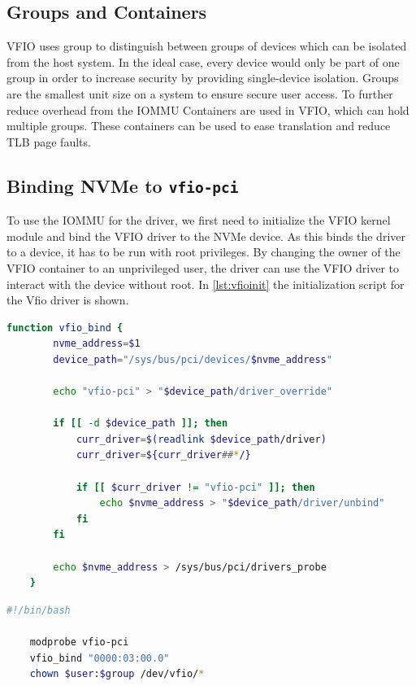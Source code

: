 \subsection{Groups and Containers}
VFIO uses group to distinguish between groups of devices which can be isolated from the host system. In the ideal case, every device would only be part of one group in order to increase security by providing single-device isolation. Groups are the smallest unit size on a system to ensure secure user access.
To further reduce overhead from the IOMMU Containers are used in VFIO, which can hold multiple groups. These containers can be used to ease translation and reduce TLB page faults.

\subsection{Binding NVMe to \texttt{vfio-pci}}\label{sec:bindvfiopci}
To use the IOMMU for the driver, we first need to initialize the VFIO kernel module and bind the VFIO driver to the NVMe device.
As this binds the driver to a device, it has to be run with root privileges.
By changing the owner of the VFIO container to an unprivileged user, the driver can use the VFIO driver to interact with the device without root.
In \autoref{lst:vfioinit} the initialization script for the Vfio driver is shown.

\begin{lstlisting}[language=bash,caption={\texttt{vfio-pci} binding function in bash}, label=lst:vfiobind, frame=single]
    function vfio_bind {
        nvme_address=$1
        device_path="/sys/bus/pci/devices/$nvme_address"

        echo "vfio-pci" > "$device_path/driver_override"

        if [[ -d $device_path ]]; then
            curr_driver=$(readlink $device_path/driver)
            curr_driver=${curr_driver##*/}

            if [[ $curr_driver != "vfio-pci" ]]; then
                echo $nvme_address > "$device_path/driver/unbind"
            fi
        fi

        echo $nvme_address > /sys/bus/pci/drivers_probe
    }
\end{lstlisting}

\begin{lstlisting}[language=bash,caption={Initializing \texttt{vfio-pci} using \texttt{vfio\_bind} from \autoref{lst:vfiobind} and setting permissions}, label=lst:vfioinit, frame=single]
    #!/bin/bash
    
    modprobe vfio-pci
    vfio_bind "0000:03:00.0"
    chown $user:$group /dev/vfio/*
\end{lstlisting}


